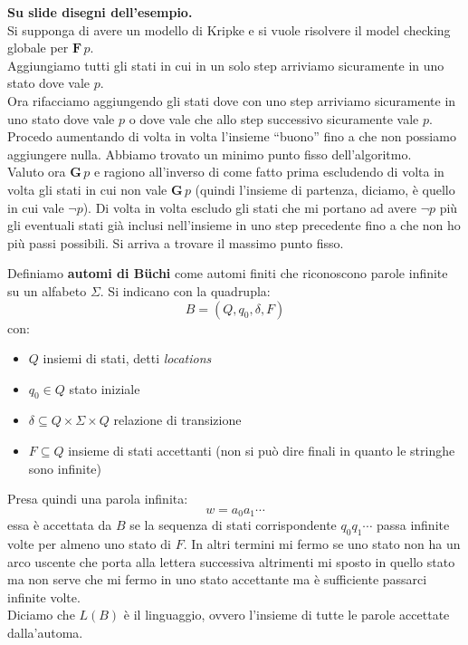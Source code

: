 \documentclass[a4paper,12pt, oneside]{book}
\begin{document}
\begin{esempio}
  \textbf{Su slide disegni dell'esempio.}\\
  Si supponga di avere un modello di Kripke e si vuole risolvere il model
  checking globale per $\mathbf{F}\,p$.\\
  Aggiungiamo tutti gli stati in cui in un solo step arriviamo sicuramente in
  uno stato dove vale $p$. \\
  Ora rifacciamo aggiungendo gli stati dove con uno step arriviamo sicuramente
  in uno stato dove vale $p$ o dove vale che allo step successivo sicuramente
  vale $p$. Procedo aumentando di volta in volta l'insieme ``buono'' fino a che
  non possiamo aggiungere nulla. Abbiamo trovato un minimo punto fisso
  dell'algoritmo. \\
  Valuto ora $\mathbf{G}\,p$ e ragiono all'inverso di come fatto prima
  escludendo di volta in volta gli stati in cui non vale $\mathbf{G}\,p$ (quindi
  l'insieme di partenza, diciamo, è quello in cui vale $\neg p$). Di volta in
  volta escludo gli stati che mi portano ad avere $\neg p$ più gli eventuali
  stati già inclusi nell'insieme in uno step precedente fino a che non ho più
  passi possibili. Si arriva a trovare il massimo punto fisso.
\end{esempio}
\begin{definizione}
  Definiamo \textbf{automi di B\"{u}chi} come automi finiti che riconoscono
  parole infinite su un alfabeto $\Sigma$. Si indicano con la quadrupla:
  \[B=(Q,q_0,\delta,F)\]
  con:
  \begin{itemize}
    \item $Q$ insiemi di stati, detti \textit{locations}
    \item $q_0\in Q$ stato iniziale
    \item $\delta\subseteq Q\times \Sigma\times Q$ relazione di transizione
    \item $F\subseteq Q$ insieme di stati accettanti (non si può dire finali in
    quanto le stringhe sono infinite)
  \end{itemize}
  Presa quindi una parola infinita:
  \[w=a_0a_1\cdots\]
  essa è accettata da $B$ se la sequenza di stati corrispondente $q_0q_1\cdots$
  passa infinite volte per almeno uno stato di $F$. In altri termini mi fermo se
  uno stato non ha un arco uscente che porta alla lettera successiva altrimenti
  mi sposto in quello stato ma non serve che mi fermo in uno stato accettante ma
  è sufficiente passarci infinite volte.\\
  Diciamo che $L(B)$ è il linguaggio, ovvero l'insieme di tutte le parole
  accettate dalla'automa.
\end{definizione}
\end{document}
